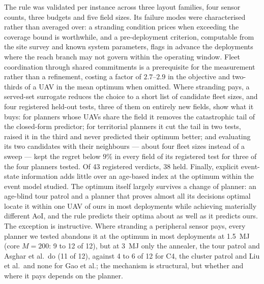 \documentclass[journal,outdir=./]{IEEEtran}
\begin{document}
The rule was validated per instance across three layout families, four sensor counts, three budgets and five field sizes. Its failure modes were characterised rather than averaged over: a stranding condition prices when exceeding the coverage bound is worthwhile, and a pre-deployment criterion, computable from the site survey and known system parameters, flags in advance the deployments where the reach branch may not govern within the operating window. Fleet coordination through shared commitments is a prerequisite for the measurement rather than a refinement, costing a factor of $2.7$--$2.9$ in the objective and two-thirds of a UAV in the mean optimum when omitted. Where stranding pays, a served-set surrogate reduces the choice to a short list of candidate fleet sizes, and four registered held-out tests, three of them on entirely new fields, show what it buys: for planners whose UAVs share the field it removes the catastrophic tail of the closed-form predictor; for territorial planners it cut the tail in two tests, raised it in the third and never predicted their optimum better; and evaluating its two candidates with their neighbours --- about four fleet sizes instead of a sweep --- kept the regret below $9\%$ in every field of its registered test for three of the four planners tested. Of 43 registered verdicts, 38 held. Finally, explicit event-state information adds little over an age-based index at the optimum within the event model studied. The optimum itself largely survives a change of planner: an age-blind tour patrol and a planner that proves almost all its decisions optimal locate it within one UAV of ours in most deployments while achieving materially different AoI, and the rule predicts their optima about as well as it predicts ours. The exception is instructive. Where stranding a peripheral sensor pays, every planner we tested abandons it at the optimum in most deployments at 1.5~MJ (core $M=200$: 9 to 12 of 12), but at 3~MJ only the annealer, the tour patrol and Asghar et al.\ do (11 of 12), against 4 to 6 of 12 for C4, the cluster patrol and Liu et al.\ and none for Gao et al.; the mechanism is structural, but whether and where it pays depends on the planner.

\appendices
\end{document}
